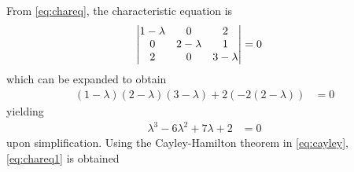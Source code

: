 
From   \eqref{eq:chareq}, the characteristic equation is 
\begin{align}
%
 \mydet{1 -\lambda & 0 & 2 \\ 0 & 2 -\lambda & 1 \\ 2 & 0 & 3-\lambda} &= 0  
\end{align}
which can be expanded to obtain 
\begin{align}
%
 (1-\lambda)(2-\lambda)(3-\lambda) + 2(-2(2-\lambda)) &= 0
\end{align}
yielding
\begin{align}
%
 \lambda^3 - 6\lambda^2 + 7\lambda + 2 &= 0
\end{align}
%
upon simplification. 
Using  the Cayley-Hamilton theorem in \eqref{eq:cayley}, 	\eqref{eq:chareq1} is obtained
%
